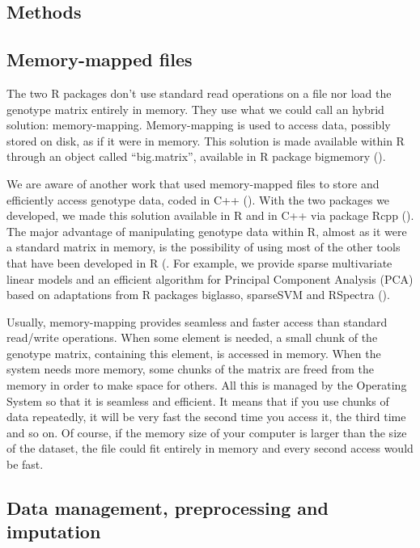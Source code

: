 \documentclass{bioinfo}
\begin{document}
\begin{methods}
\section{Methods}

\subsection{Memory-mapped files}

The two R packages don't use standard read operations on a file nor load the genotype matrix entirely in memory. They use what we could call an hybrid solution: memory-mapping. Memory-mapping is used to access data, possibly stored on disk, as if it were in memory. This solution is made available within R through an object called ``big.matrix'', available in R package bigmemory (\cite{Kane2013}).


We are aware of another work that used memory-mapped files to store and efficiently access genotype data, coded in C++ (\cite{Nielsen2008}). With the two packages we developed, we made this solution available in R and in C++ via package Rcpp (\cite{Eddelbuettel2011}). The major advantage of manipulating genotype data within R, almost as it were a standard matrix in memory, is the possibility of using most of the other tools that have been developed in R (\cite{R2017}. For example, we provide sparse multivariate linear models and an efficient algorithm for Principal Component Analysis (PCA) based on adaptations from R packages biglasso, sparseSVM and RSpectra (\cite{Zeng2017,RSpectra2016}).

Usually, memory-mapping provides seamless and faster access than standard read/write operations. When some element is needed, a small chunk of the genotype matrix, containing this element, is accessed in memory. When the system needs more memory, some chunks of the matrix are freed from the memory in order to make space for others. All this is managed by the Operating System so that it is seamless and efficient. It means that if you use chunks of data repeatedly, it will be very fast the second time you access it, the third time and so on. Of course, if the memory size of your computer is larger than the size of the dataset, the file could fit entirely in memory and every second access would be fast. 


\subsection{Data management, preprocessing and imputation} \label{sec:preprocess}


\end{methods}
\end{document}
